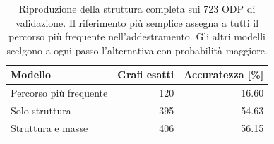 \begin{table}[htbp]
\centering
\small
\begin{tabular}{@{}lrr@{}}
\toprule
\textbf{Modello} & \textbf{Grafi esatti} & \textbf{Accuratezza [\%]}\\
\midrule
Percorso più frequente & 120 & \num{16.60}\\
Solo struttura & 395 & \num{54.63}\\
Struttura e masse & 406 & \num{56.15}\\
\bottomrule
\end{tabular}
\caption{Riproduzione della struttura completa sui 723 ODP di validazione. Il riferimento più semplice assegna a tutti il percorso più frequente nell'addestramento. Gli altri modelli scelgono a ogni passo l'alternativa con probabilità maggiore.}
\label{tab:graph-generation-comparison}
\end{table}
